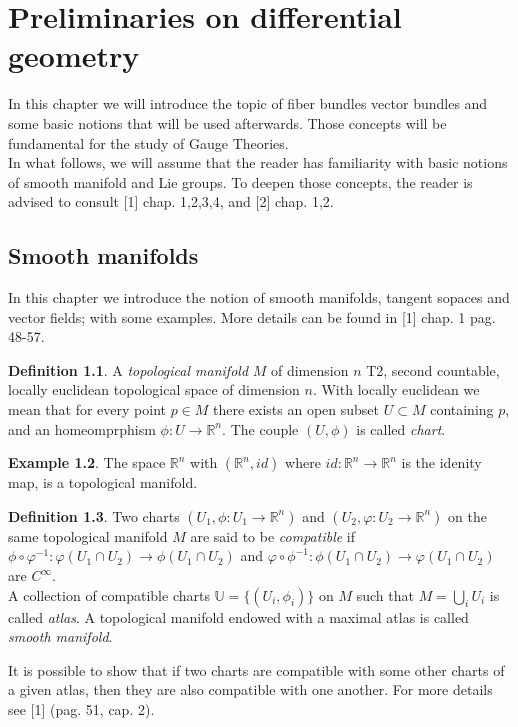 \documentclass[12pt,a4paper]{report}
\theoremstyle{definition}
\newtheorem{Def}{Definition}[chapter]
\theoremstyle{Theorem}
\theoremstyle{definition}
\newtheorem{Ex}[Def]{Example}
\theoremstyle{definition}
\begin{document}
	\tableofcontents
	\chapter{Preliminaries on differential geometry}
		In this chapter we will introduce the topic of fiber bundles vector bundles and some basic notions that will be used afterwards. Those concepts will be fundamental for the study of Gauge Theories.\\
		In what follows, we will assume that the reader has familiarity with basic notions of smooth manifold and Lie groups. To deepen those concepts, the reader is advised to consult [1] chap. 1,2,3,4, and [2] chap. 1,2.
		\section{Smooth manifolds}
		In this chapter we introduce the notion of smooth manifolds, tangent sopaces and vector fields; with some examples. More details can be found in [1] chap. 1 pag. 48-57.
		\begin{Def}
			A \textit{topological manifold} $M$ of dimension $n$ T2, second countable, locally euclidean topological space of dimension $n$. With locally euclidean we mean that for every point $p\in M$ there exists an open subset $U\subset M$ containing $p$, and an homeomprphism $\phi:U\rightarrow\mathbb{R}^n$. The couple $(U,\phi)$ is called \textit{chart}. 
		\end{Def}
		\begin{Ex}
			The space $\mathbb{R}^n$ with $(\mathbb{R}^n, id)$ where $id:\mathbb{R}^n\rightarrow \mathbb{R}^n$ is the idenity map, is a topological manifold. 
		\end{Ex}
		\begin{Def}
			Two charts $(U_1,\phi:U_1\rightarrow\mathbb{R}^n)$ and $(U_2,\varphi:U_2\rightarrow\mathbb{R}^n)$ on the same topological manifold $M$ are said to be \textit{compatible} if
			$\phi\circ\varphi^{-1}:\varphi(U_1\cap U_2)\rightarrow \phi(U_1\cap U_2)$ and $\varphi\circ\phi^{-1}:\phi(U_1\cap U_2)\rightarrow \varphi(U_1\cap U_2)$ are $C^\infty$.\\
			A collection of compatible charts $\mathbb{U}=\{(U_i,\phi_{i})\}$ on $M$ such that $M=\bigcup_i U_i$ is called \textit{atlas}. A topological manifold endowed with a maximal atlas is called \textit{smooth manifold}.
		\end{Def}
		It is possible to show that if two charts are compatible with some other charts of a given atlas, then they are also compatible with one another. For more details see [1] (pag. 51, cap. 2).
\end{document}
